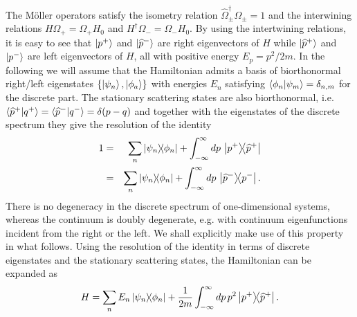 The M\"oller operators satisfy the isometry relation $\widehat{\Omega}_{\pm}^\dagger\Omega_{\pm} = 1$ and the interwining relations $H \Omega_+ = \Omega_+ H_0$ and $H^\dagger \Omega_- = \Omega_- H_0$.
By using the intertwining relations, it is easy to see that $\ket{p^+}$ and $\ket{\widehat{p}^-}$ are right eigenvectors of $H$ while $\ket{\widehat{p}^+}$ and $\ket{p^-}$ are left eigenvectors of $H$, all with positive energy $E_p = p^2/2m$. In the following we will assume that the Hamiltonian admits a basis of biorthonormal
right/left eigenstates $\left\{ \ket{\psi_n} , \ket{\phi_a} \right\}$ with energies $E_n$ satisfying $\braket{\phi_n}{\psi_m} = \delta_{n,m}$ for the discrete part. The stationary scattering states are also biorthonormal, i.e. $\braket{\widehat{p}^+}{q^+} = \braket{\widehat{p}^-}{q^-} = \delta (p-q)$ and together with the eigenstates of the discrete spectrum they give the resolution of the identity
%
\begin{eqnarray}
    1 &=& \sum_{n}\ketbra{\psi_n}{\phi_n} + \int_{-\infty}^{\infty} dp\, \ketbra{p^+}{\widehat{p}^+}
    \nonumber\\
    &=& \sum_{n}\ketbra{\psi_n}{\phi_n} + \int_{-\infty}^{\infty} dp\, \ketbra{\widehat{p}^-}{p^-}.
    \label{eq:identity}
\end{eqnarray}
%
There is no degeneracy in the discrete spectrum of one-dimensional systems, whereas the continuum is doubly degenerate,
e.g. with continuum eigenfunctions incident from the right or the left.  We shall explicitly make use of this property in what follows. Using the resolution of the identity in terms of discrete eigenstates and the stationary scattering states, the Hamiltonian can be expanded as
%
\begin{equation}
    H = \sum_{n}E_n\ketbra{\psi_n}{\phi_n} + \frac{1}{2m}\int_{-\infty}^{\infty} dp\,p^2 \ketbra{p^+}{\widehat{p}^+}.
    \label{eq:H_Expansion_Continuous}
\end{equation}
%
